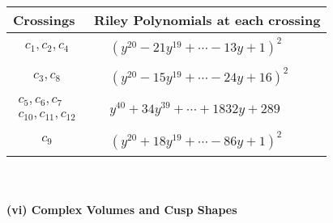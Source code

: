 \documentclass[1p]{elsarticle_modified}
\theoremstyle{definition}
\begin{document}
\begin{tabular}{m{50pt}|m{274pt}}
Crossings & \hspace{64pt}Riley Polynomials at each crossing \\
\hline $$\begin{aligned}c_{1},c_{2},c_{4}\end{aligned}$$&$\begin{aligned}
&(y^{20}-21 y^{19}+\cdots-13 y+1)^{2}
\end{aligned}$\\
\hline $$\begin{aligned}c_{3},c_{8}\end{aligned}$$&$\begin{aligned}
&(y^{20}-15 y^{19}+\cdots-24 y+16)^{2}
\end{aligned}$\\
\hline $$\begin{aligned}c_{5},c_{6},c_{7}\\c_{10},c_{11},c_{12}\end{aligned}$$&$\begin{aligned}
&y^{40}+34 y^{39}+\cdots+1832 y+289
\end{aligned}$\\
\hline $$\begin{aligned}c_{9}\end{aligned}$$&$\begin{aligned}
&(y^{20}+18 y^{19}+\cdots-86 y+1)^{2}
\end{aligned}$\\
\hline
\end{tabular}\\~\\
\newpage\flushleft \textbf{(vi) Complex Volumes and Cusp Shapes}
\end{document}
